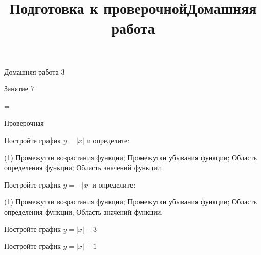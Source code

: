 \begin{homework}[number=3]
	\begin{listofex}
		\item Домашняя работа 3
	\end{listofex}
\end{homework}

\begin{class}[number=7]
	\title{Подготовка к проверочной}
	\begin{listofex}
		\item Занятие 7
	\end{listofex}
\end{class}

=%
\begin{exam}
	\begin{listofex}
		\item Проверочная
	\end{listofex}
\end{exam}

\begin{consultation}
	\begin{listofex}
		\item Постройте график \( y=|x| \) и определите: 
		\begin{tasks}(1)
			\task Промежутки возрастания функции;
			\task Промежутки убывания функции;
			\task Область определения функции;
			\task Область значений функции.
		\end{tasks}
		\item Постройте график \( y=-|x| \) и определите: 
		\begin{tasks}(1)
			\task Промежутки возрастания функции;
			\task Промежутки убывания функции;
			\task Область определения функции;
			\task Область значений функции.
		\end{tasks}
		\item Постройте график \( y=|x|-3 \)
	\end{listofex}
	\newpage
	\title{Домашняя работа}
	\begin{listofex}
		\item Постройте график \( y=|x|+1 \)
	\end{listofex}
\end{consultation}
